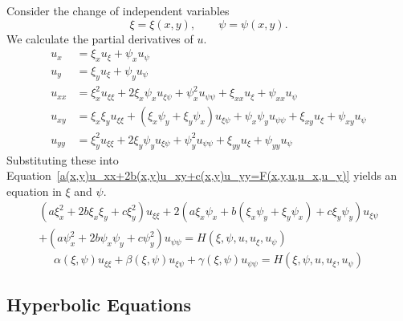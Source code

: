 Consider the change of independent variables 
\[
\xi = \xi(x,y), \qquad \psi = \psi(x,y).
\]
We calculate the partial derivatives of $u$.
\begin{align*}
  u_x &= \xi_x u_\xi + \psi_x u_\psi 
  \\
  u_y &= \xi_y u_\xi + \psi_y u_\psi 
  \\
  u_{xx} &= \xi_x^2 u_{\xi \xi} + 2 \xi_x \psi_x u_{\xi\psi} + \psi_x^2 u_{\psi\psi} + \xi_{xx} u_\xi + \psi_{xx} u_{\psi} 
  \\
  u_{x y} &= \xi_x \xi_y u_{\xi\xi} + (\xi_x \psi_y + \xi_y \psi_x) u_{\xi\psi}      + \psi_x \psi_y u_{\psi\psi} + \xi_{x y} u_\xi + \psi_{x y} u_\psi 
  \\
  u_{y y} &= \xi_y^2 u_{\xi\xi} + 2 \xi_y \psi_y u_{\xi\psi} + \psi_y^2 u_{\psi\psi} + \xi_{y y} u_{\xi} + \psi_{y y} u_\psi
\end{align*}
Substituting these into 
Equation~\ref{a(x,y)u_xx+2b(x,y)u_xy+c(x,y)u_yy=F(x,y,u,u_x,u_y)}
yields an equation in $\xi$ and $\psi$.
\begin{multline*}
  \label{left(axi_x^2+2bxi_xxi_y+cxi_y^2right)u_xixi}
  \left( a \xi_x^2 + 2 b \xi_x \xi_y + c \xi_y^2 \right) u_{\xi\xi}
  + 2 \left( a \xi_x \psi_x + b(\xi_x \psi_y + \xi_y \psi_x ) + c \xi_y \psi_y \right) u_{\xi\psi} 
  \\
  + \left( a \psi_x^2 + 2 b \psi_x \psi_y + c \psi_y^2 \right) u_{\psi\psi} = H(\xi, \psi, u, u_\xi, u_\psi)
\end{multline*}
\begin{equation}
  \label{alpha(xi,eta)u_xixi+beta(xi,eta)u_xieta}
  \alpha(\xi,\psi) u_{\xi \xi} + \beta(\xi,\psi) u_{\xi \psi} + \gamma(\xi,\psi) u_{\psi \psi} = H(\xi, \psi, u, u_\xi, u_\psi)
\end{equation}










\subsection{Hyperbolic Equations}



